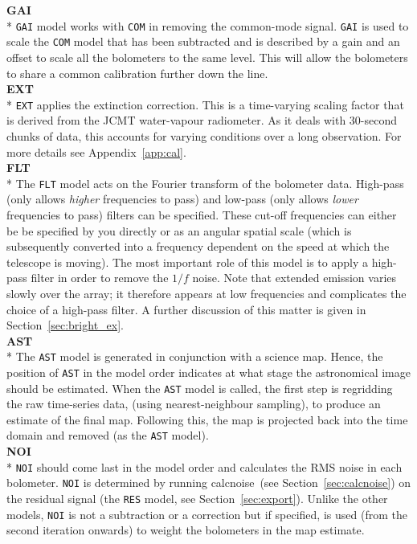\documentclass[twoside,11pt]{article}
\newcommand{\htmlref}[2]{#1}
\newcommand{\latexhtml}[2]{#1}
\newcommand{\xref}[3]{#1}
\renewcommand{\_}{\texttt{\symbol{95}}}
\newcommand{\task}[1]{\textsf{#1}}
\newcommand{\model}[1]{\texttt{#1}}
\newcommand{\calcnoise}{\xref{\task{calcnoise}}{sun258}{CALCNOISE}}
\newcommand{\cref}[3]{\latexhtml{#1~\ref{#2}}{\htmlref{#3}{#2}}}
\begin{document}
\begin{htmlonly}
\textbf{GAI}\\*
\model{GAI} model works with
\model{COM} in removing the common-mode signal. \model{GAI} is used to
scale the \model{COM} model that has been subtracted and is described by
a gain and an offset to scale all the bolometers to the same level. This
will allow the bolometers to share a common calibration further down the
line. \\

\textbf{EXT}\\*
\model{EXT} applies the extinction
correction. This is a time-varying scaling factor that is derived from
the JCMT water-vapour radiometer. As it deals with 30-second chunks of
data, this accounts for varying conditions over a long observation. For
more details see \cref{Appendix}{app:cal}{SCUBA-2 data calibration}. \\


\textbf{FLT}\\*
The \model{FLT} model acts on the Fourier transform
of the bolometer data. High-pass (only allows \textit{higher} frequencies to
pass) and low-pass (only allows \textit{lower} frequencies to pass) filters
can be specified. These cut-off frequencies can either be be specified by
you directly or as an angular spatial scale (which is subsequently
converted into a frequency dependent on the speed at which the
telescope is moving). The most important role of this model is to
apply a high-pass filter in order to remove the $1/f$ noise. Note that
extended emission varies slowly over the array; it therefore appears
at low frequencies and complicates the choice of a high-pass filter. A
further discussion of this matter is given in
\cref{Section}{sec:bright_ex}{Extended galactic sources}.\\

\textbf{AST}\\*
The \model{AST} model is generated in
conjunction with a science map. Hence, the position of \model{AST} in the
model order indicates at what stage the astronomical
image should be estimated. When the \model{AST} model is called, the first
step is regridding the raw time-series data, (using nearest-neighbour sampling),
to produce an estimate of the final map. Following this, the map is
projected back into the time domain and removed (as the \model{AST}
model).\\


\textbf{NOI}\\*
\model{NOI} should come last in the model
order and calculates the RMS noise in each bolometer.  \model{NOI} is
determined by running \calcnoise\ (see \cref{Section}{sec:calcnoise}{Checking the
array performance}) on the residual signal (the \model{RES}
model, see \cref{Section}{sec:export}{Exporting individual models}).  Unlike
the other models, \model{NOI} is
not a subtraction or a correction but if specified, is used (from the
second iteration onwards) to weight the bolometers in the map
estimate.\\
\end{htmlonly}
\end{document}
